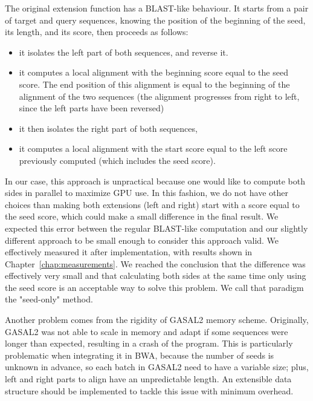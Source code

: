 The original extension function has a BLAST-like behaviour. It starts from a pair of target and query sequences, knowing the position of the beginning of the seed, its length, and its score, then proceeds as follows:
\begin{itemize}
	\item it isolates the left part of both sequences, and reverse it.
	\item it computes a local alignment with the beginning score equal to the seed score. The end position of this alignment is equal to the beginning of the alignment of the two sequences (the alignment progresses from right to left, since the left parts have been reversed)
	\item it then isolates the right part of both sequences,
	\item it computes a local alignment with the start score equal to the left score previously computed (which includes the seed score).
\end{itemize}

In our case, this approach is unpractical because one would like to compute both sides in parallel to maximize GPU use. In this fashion, we do not have other choices than making both extensions (left and right) start with a score equal to the seed score, which could make a small difference in the final result. We expected this error between the regular BLAST-like computation and our slightly different approach to be small enough to consider this approach valid. We effectively measured it after implementation, with results shown in Chapter~\ref{chap:measurements}. We reached the conclusion that the difference was effectively very small and that calculating both sides at the same time only using the seed score is an acceptable way to solve this problem. We call that paradigm the "seed-only" method.

Another problem comes from the rigidity of GASAL2 memory scheme. Originally, GASAL2 was not able to scale in memory and adapt if some sequences were longer than expected, resulting in a crash of the program. This is particularly problematic when integrating it in BWA, because the number of seeds is unknown in advance, so each batch in GASAL2 need to have a variable size; plus, left and right parts to align have an unpredictable length. 
An extensible data structure should be implemented to tackle this issue with minimum overhead.


